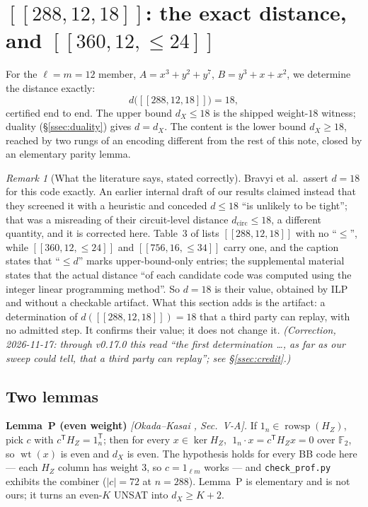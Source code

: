 \documentclass[11pt]{amsart}
\newcommand{\FF}{\mathbb{F}_{2}}
\newcommand{\rowsp}{\operatorname{rowsp}}
\newcommand{\wt}{\operatorname{wt}}
\newcommand{\HZ}{H_{Z}}
\newcommand{\dX}{d_{X}}
\newcommand{\dcirc}{d_{\mathrm{circ}}}
\theoremstyle{plain}
\theoremstyle{definition}
\theoremstyle{remark}
\newtheorem{remark}[theorem]{Remark}
\begin{document}
\section{$[[288,12,18]]$: the exact distance, and $[[360,12,\le24]]$}\label{sec:288}

For the $\ell=m=12$ member, $A=x^{3}+y^{2}+y^{7}$, $B=y^{3}+x+x^{2}$, we
determine the distance exactly:
\[
  d\bigl([[288,12,18]]\bigr)=18 ,
\]
certified end to end. The upper bound $\dX\le18$ is the shipped weight-$18$
witness; duality (\S\ref{ssec:duality}) gives $d=\dX$. The content is the lower
bound $\dX\ge18$, reached by two rungs of an encoding different from the rest of
this note, closed by an elementary parity lemma.

\begin{remark}[What the literature says, stated correctly]\label{rem:288}
Bravyi et al.\ assert $d=18$ for this code exactly. An earlier internal draft of
our results claimed instead that they screened it with a heuristic and conceded
$d\le18$ ``is unlikely to be tight''; that was a misreading of their
circuit-level distance $\dcirc\le18$, a different quantity, and it is corrected
here. Table~3 of \cite{BCGMRY} lists $[[288,12,18]]$ with no ``$\le$'', while
$[[360,12,\le24]]$ and $[[756,16,\le34]]$ carry one, and the caption states that
``$\le d$'' marks upper-bound-only entries; the supplemental material states
that the actual distance ``of each candidate code was computed using the integer
linear programming method''. So $d=18$ is their value, obtained by ILP and
without a checkable artifact. What this section adds is the artifact: a
determination of $d([[288,12,18]])=18$ that a third party can replay, with no
admitted step. It confirms their value; it does not change it.
\emph{(Correction, 2026-11-17: through v0.17.0 this read ``the first
determination \dots, as far as our sweep could tell, that a third party can
replay''; see \S\ref{ssec:credit}.)}
\end{remark}

\subsection{Two lemmas}\label{ssec:PS}
\noindent\textbf{Lemma~P (even weight)} \emph{[Okada--Kasai \cite{OkadaKasai},
Sec.~V-A].} If $1_n\in\rowsp(\HZ)$, pick $c$ with $c^{\mathsf T}\HZ=1_n^{\mathsf
T}$; then for every $x\in\ker\HZ$, $\;1_n\cdot x=c^{\mathsf T}\HZ x=0$ over
$\FF$, so $\wt(x)$ is even and $\dX$ is even. The hypothesis holds for every BB
code here --- each $\HZ$ column has weight $3$, so $c=1_{\ell m}$ works --- and
\texttt{check\_prof.py} exhibits the combiner ($|c|=72$ at $n=288$). Lemma~P is
elementary and is not ours; it turns an even-$K$ UNSAT into $\dX\ge K+2$.
\end{document}
